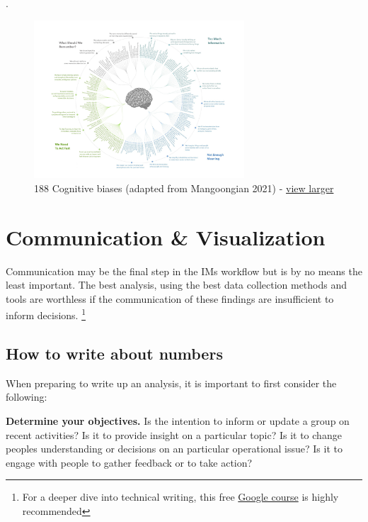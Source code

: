 \documentclass[
  a4paper,
  onecolumn,
  oneside]{book}
\begin{document}
.

\begin{figure}

{\centering \includegraphics[width=0.7\textwidth,height=\textheight]{part1/./images/cognitive-bias.jpg}

}

\caption{188 Cognitive biases (adapted from Mangoongian 2021) -
\href{./images/cognitive-bias.jpg}{view larger}}

\end{figure}

\hypertarget{communication-visualization}{%
\chapter{Communication \&
Visualization}\label{communication-visualization}}

Communication may be the final step in the IMs workflow but is by no
means the least important. The best analysis, using the best data
collection methods and tools are worthless if the communication of these
findings are insufficient to inform decisions. \footnote{For a deeper
  dive into technical writing, this free
  \href{https://developers.google.com/tech-writing/overview}{Google
  course} is highly recommended}

\hypertarget{how-to-write-about-numbers}{%
\section{How to write about numbers}\label{how-to-write-about-numbers}}

When preparing to write up an analysis, it is important to first
consider the following:

\textbf{Determine your objectives.} Is the intention to inform or update
a group on recent activities? Is it to provide insight on a particular
topic? Is it to change peoples understanding or decisions on an
particular operational issue? Is it to engage with people to gather
feedback or to take action?
\end{document}
